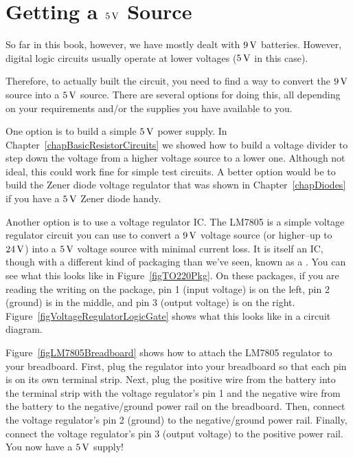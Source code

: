 \section{Getting a $5\,\si{\volt}$ Source}

So far in this book, however, we have mostly dealt with $9\,\si{\volt}$ batteries.
However, digital logic circuits usually operate at lower voltages ($5\,\si{\volt}$ in this case).

Therefore, to actually built the circuit, you need to find a way to convert the $9\,\si{\volt}$ source into a $5\,\si{\volt}$ source.
There are several options for doing this, all depending on your requirements and/or the supplies you have available to you.

One option is to build a simple $5\,\si{\volt}$ power supply.
In Chapter~\ref{chapBasicResistorCircuits} we showed how to build a voltage divider to step down the voltage from a higher voltage source to a lower one.
Although not ideal, this could work fine for simple test circuits.
A better option would be to build the Zener diode voltage regulator that was shown in Chapter~\ref{chapDiodes} if you have a $5\,\si{\volt}$ Zener diode handy.


Another option is to use a voltage regulator IC.
The LM7805 is a simple voltage regulator circuit you can use to convert a $9\,\si{\volt}$ voltage source (or higher--up to $24\,\si{\volt}$) into a $5\,\si{\volt}$ voltage source with minimal current loss.
It is itself an IC, though with a different kind of packaging than we've seen, known as a .
You can see what this looks like in Figure~\ref{figTO220Pkg}.
On these packages, if you are reading the writing on the package, pin 1 (input voltage) is on the left, pin 2 (ground) is in the middle, and pin 3 (output voltage) is on the right.
Figure~\ref{figVoltageRegulatorLogicGate} shows what this looks like in a circuit diagram.



Figure~\ref{figLM7805Breadboard} shows how to attach the LM7805 regulator to your breadboard.
First, plug the regulator into your breadboard so that each pin is on its own terminal strip.
Next, plug the positive wire from the battery into the terminal strip with the voltage regulator's pin 1 and the negative wire from the battery to the negative/ground power rail on the breadboard.
Then, connect the voltage regulator's pin 2 (ground) to the negative/ground power rail. 
Finally, connect the voltage regulator's pin 3 (output voltage) to the positive power rail.
You now have a $5\,\si{\volt}$ supply!

